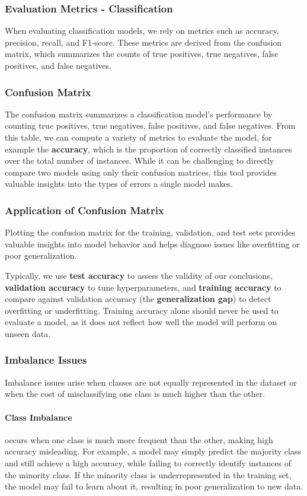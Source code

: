 \subsubsection{Evaluation Metrics - Classification}
When evaluating classification models, we rely on metrics such as accuracy, precision, recall, and F1-score. 
These metrics are derived from the confusion matrix, which summarizes the counts of true positives, true negatives, false positives, and false negatives.

\subsubsection*{Confusion Matrix}
The confusion matrix summarizes a classification model's performance by counting true positives, true negatives, false positives, and false negatives.
From this table, we can compute a variety of metrics to evaluate the model, for example the \textbf{accuracy}, which is the proportion of correctly classified instances over the total number of instances.
While it can be challenging to directly compare two models using only their confusion matrices, this tool provides valuable insights into the types of errors a single model makes.

\subsubsection*{Application of Confusion Matrix}
Plotting the confusion matrix for the training, validation, and test sets provides valuable insights into model behavior and helps diagnose issues like overfitting or poor generalization.

Typically, we use \textbf{test accuracy} to assess the validity of our conclusions, 
\textbf{validation accuracy} to tune hyperparameters, 
and \textbf{training accuracy} to compare against validation accuracy (the \textbf{generalization gap}) to detect overfitting or underfitting.
Training accuracy alone should never be used to evaluate a model, as it does not reflect how well the model will perform on unseen data.

\subsubsection*{Imbalance Issues}
Imbalance issues arise when classes are not equally represented in the dataset or when the cost of misclassifying one class 
is much higher than the other.

\paragraph{Class Imbalance} occurs when one class is much more frequent than the other, making high accuracy misleading.
For example, a model may simply predict the majority class and still achieve a high accuracy, while failing to correctly identify instances of the minority class.
If the minority class is underrepresented in the training set, the model may fail to learn about it, resulting in poor generalization to new data.

